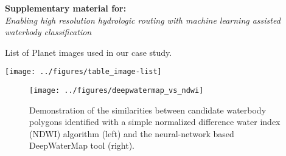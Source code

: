 \documentclass[12pt]{article}
\begin{document}
\begin{center}
\textbf{Supplementary material for:}\\
\emph{Enabling high resolution hydrologic routing with machine learning assisted waterbody classification}
\end{center}

\begin{table}[h!]
    \begin{center}
          \caption{List of Planet images used in our case study.}
          \texttt{[image: ../figures/table\_image-list]}
    \end{center}    
\end{table}

\begin{figure}[h!]
    \begin{center}
          \texttt{[image: ../figures/deepwatermap\_vs\_ndwi]}
          \caption{Demonstration of the similarities between candidate waterbody polygons identified with a simple normalized difference water index (NDWI) algorithm (left) and the neural-network based DeepWaterMap tool (right).}
    \end{center}    
\end{figure}

\clearpage
\end{document}
